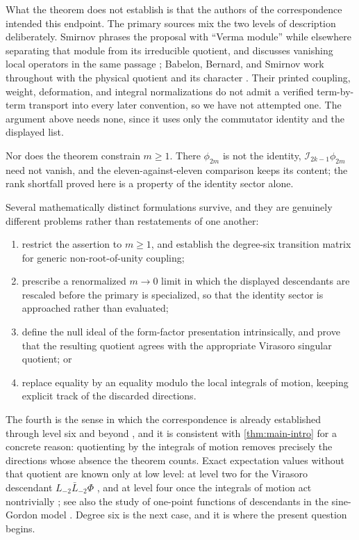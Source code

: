 \documentclass[11pt,reqno]{amsart}
\theoremstyle{plain}
\theoremstyle{definition}
\theoremstyle{remark}
\numberwithin{equation}{section}
\newcommand{\Iop}{\mathcal I}
\begin{document}
What the theorem does not establish is that the authors of the correspondence
intended this endpoint. The primary sources mix the two levels of description
deliberately. Smirnov phrases the proposal with ``Verma module'' while
elsewhere separating that module from its irreducible quotient, and discusses
vanishing local operators in the same passage \cite{Smirnov_1998so}; Babelon,
Bernard, and Smirnov work throughout with the physical quotient and its
character \cite{Babelon_1997nv}. Their printed coupling, weight, deformation,
and integral normalizations do not admit a verified term-by-term transport
into every later convention, so we have not attempted one. The argument above
needs none, since it uses only the commutator identity and the displayed
list.

Nor does the theorem constrain $m\ge1$. There $\phi_{2m}$ is not the identity,
$\Iop_{2k-1}\phi_{2m}$ need not vanish, and the eleven-against-eleven
comparison keeps its content; the rank shortfall proved here is a property of
the identity sector alone.

Several mathematically distinct formulations survive, and they are genuinely
different problems rather than restatements of one another:
\begin{enumerate}
  \item restrict the assertion to $m\ge1$, and establish the degree-six
    transition matrix for generic non-root-of-unity coupling;
  \item prescribe a renormalized $m\to0$ limit in which the displayed
    descendants are rescaled before the primary is specialized, so that the
    identity sector is approached rather than evaluated;
  \item define the null ideal of the form-factor presentation intrinsically,
    and prove that the resulting quotient agrees with the appropriate
    Virasoro singular quotient; or
  \item replace equality by an equality modulo the local integrals of motion,
    keeping explicit track of the discarded directions.
\end{enumerate}
The fourth is the sense in which the correspondence is already established
through level six and beyond \cite{Boos_2010hg,Boos_2011fb,Negro_2013rr,
Jimbo_2011fs}, and it is consistent with \cref{thm:main-intro} for a concrete
reason: quotienting by the integrals of motion removes precisely the
directions whose absence the theorem counts. Exact
expectation values without that quotient are known only at low level: at
level two for the Virasoro descendant $L_{-2}\bar L_{-2}\Phi$
\cite{Fateev_1999ev}, and at level four once the integrals of motion act
nontrivially \cite{Boos_2018nr}; see also the study of one-point functions of
descendants in the sine-Gordon model \cite{Jimbo_2010oo}. Degree six is the next case, and it is where
the present question begins.
\end{document}
